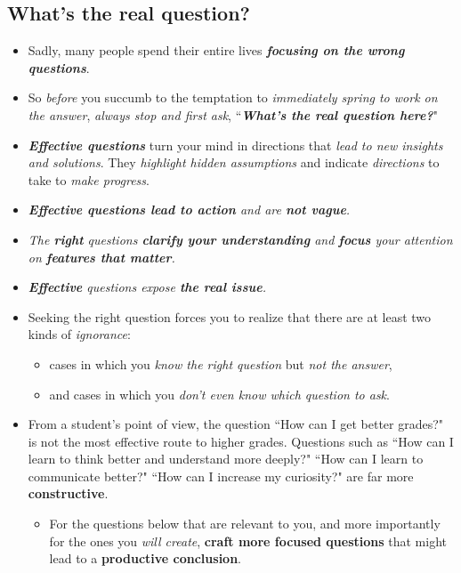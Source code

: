 \documentclass[11pt]{article}
\begin{document}
\subsection{What's the real question?}
\begin{itemize}
\item Sadly, many people spend their entire lives \emph{\textbf{focusing on the wrong questions}}.

\item So \emph{before} you succumb to the temptation to \emph{immediately spring to work on the answer}, \emph{always stop and first ask}, ``\emph{\textbf{What’s the real question here?}}" 

\item \emph{\textbf{Effective questions}} turn your mind in directions that \emph{lead to new insights and solutions}. They \emph{highlight hidden assumptions} and indicate \emph{directions} to take to \emph{make progress}. 

\item \emph{\textbf{Effective questions lead to action} and are \textbf{not vague}.}

\item \emph{The \textbf{right} questions \textbf{clarify your understanding} and \textbf{focus} your attention on \textbf{features that matter}.}

\item \emph{\textbf{Effective} questions expose \textbf{the real issue}.}

\item Seeking the right question forces you to realize that there are at least two kinds of \emph{ignorance}: 
\begin{itemize}
\item cases in which you \emph{know the right question} but \emph{not the answer},
\item and cases in which you \emph{don’t even know which question to ask}.
\end{itemize}

\item  \begin{exercise}
From a student’s point of view, the question ``How can I get better grades?" is not the most effective route to higher grades. Questions such as ``How can I learn to think better and understand more deeply?" ``How can I learn to communicate better?" ``How can I increase my curiosity?" are far more \textbf{constructive}.

\begin{itemize}
\item For the questions below that are relevant to you, and more importantly for the ones you \emph{will create}, \textbf{craft more focused questions} that might lead to a \textbf{productive conclusion}. 



\end{itemize}
\end{exercise}
\end{itemize}
\end{document}
